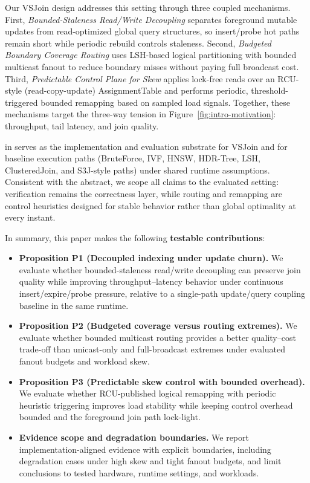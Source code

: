 Our VSJoin design addresses this setting through three coupled mechanisms. First, \emph{Bounded-Staleness Read/Write Decoupling} separates foreground mutable updates from read-optimized global query structures, so insert/probe hot paths remain short while periodic rebuild controls staleness. Second, \emph{Budgeted Boundary Coverage Routing} uses LSH-based logical partitioning with bounded multicast fanout to reduce boundary misses without paying full broadcast cost. Third, \emph{Predictable Control Plane for Skew} applies lock-free reads over an RCU-style (read-copy-update) AssignmentTable and performs periodic, threshold-triggered bounded remapping based on sampled load signals. Together, these mechanisms target the three-way tension in Figure~\ref{fig:intro-motivation}: throughput, tail latency, and join quality.

\system in \sageflow serves as the implementation and evaluation substrate for VSJoin and for baseline execution paths (BruteForce, IVF, HNSW, HDR-Tree, LSH, ClusteredJoin, and S3J-style paths) under shared runtime assumptions. Consistent with the abstract, we scope all claims to the evaluated setting: verification remains the correctness layer, while routing and remapping are control heuristics designed for stable behavior rather than global optimality at every instant.

In summary, this paper makes the following \textbf{testable contributions}:
\begin{itemize}
	\item \textbf{Proposition P1 (Decoupled indexing under update churn).} We evaluate whether bounded-staleness read/write decoupling can preserve join quality while improving throughput--latency behavior under continuous insert/expire/probe pressure, relative to a single-path update/query coupling baseline in the same runtime.
	\item \textbf{Proposition P2 (Budgeted coverage versus routing extremes).} We evaluate whether bounded multicast routing provides a better quality--cost trade-off than unicast-only and full-broadcast extremes under evaluated fanout budgets and workload skew.
	\item \textbf{Proposition P3 (Predictable skew control with bounded overhead).} We evaluate whether RCU-published logical remapping with periodic heuristic triggering improves load stability while keeping control overhead bounded and the foreground join path lock-light.
	\item \textbf{Evidence scope and degradation boundaries.} We report implementation-aligned evidence with explicit boundaries, including degradation cases under high skew and tight fanout budgets, and limit conclusions to tested hardware, runtime settings, and workloads.
\end{itemize}

